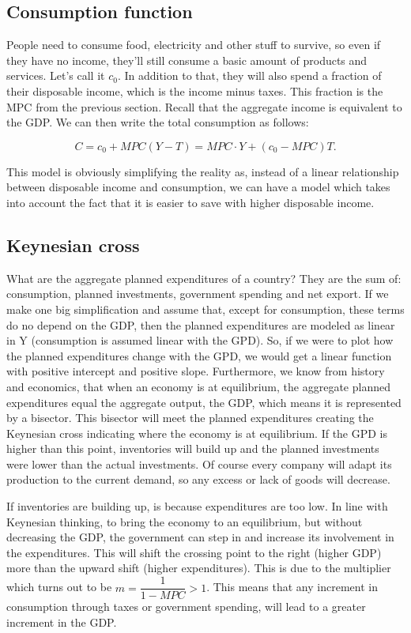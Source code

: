 \subsection{Consumption function}
People need to consume food, electricity and other stuff to survive, so even if they have no income, they'll still consume a basic amount of products and services. Let's call it $c_0$. In addition to that, they will also spend a fraction of their disposable income, which is the income minus taxes. This fraction is the MPC from the previous section. Recall that the aggregate income is equivalent to the GDP. We can then write the total consumption as follows:

\begin{equation}
C = c_0 + MPC(Y-T) = MPC \cdot Y + (c_0 - MPC)T.
\end{equation}

This model is obviously simplifying the reality as, instead of a linear relationship between disposable income and consumption, we can have a model which takes into account the fact that it is easier to save with higher disposable income.

\subsection{Keynesian cross}
What are the aggregate planned expenditures of a country? They are the sum of: consumption, planned investments, government spending and net export. If we make one big simplification and assume that, except for consumption, these terms do no depend on the GDP, then the planned expenditures are modeled as linear in Y (consumption is assumed linear with the GPD). So, if we were to plot how the planned expenditures change with the GPD, we would get a linear function with positive intercept and positive slope. Furthermore, we know from history and economics, that when an economy is at equilibrium, the aggregate planned expenditures equal the aggregate output, the GDP, which means it is represented by a bisector. This bisector will meet the planned expenditures creating the Keynesian cross indicating where the economy is at equilibrium. If the GPD is higher than this point, inventories will build up and the planned investments were lower than the actual investments. Of course every company will adapt its production to the current demand, so any excess or lack of goods will decrease. 

If inventories are building up, is because expenditures are too low. In line with Keynesian thinking, to bring the economy to an equilibrium, but without decreasing the GDP, the government can step in and increase its involvement in the expenditures. This will shift the crossing point to the right (higher GDP) more than the upward shift (higher expenditures). This is due to the multiplier which turns out to be $m = \dfrac{1}{1-MPC} > 1$. This means that any increment in consumption through taxes or government spending, will lead to a greater increment in the GDP.

